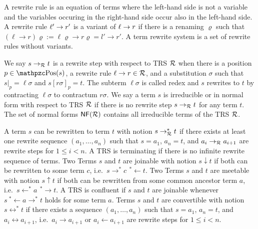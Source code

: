 \begin{definition}\label{def:rewriterule}
	A {\myem rewrite rule} is an equation of terms where the left-hand side is not a variable
	and the variables occuring in the right-hand side occur also in the left-hand side.
	A rewrite rule $\ell'\rightarrow r'$ is a {\myem variant} of $\ell\rightarrow r$ if there is a renaming $\varrho$
	such that 
	$(\ell\rightarrow r)\varrho := \ell\varrho\rightarrow r\varrho = l'\rightarrow r'$.
	A {\myem term rewrite system} is a set of rewrite rules without variants.
\end{definition}
%
\begin{definition}
	We say $s\rightarrow_{\mathcal R} t$ is a 
	{\myem rewrite step} 
	 with respect to TRS ${\mathcal R}$ 
	when there is a position $p \in \pos(s)$, 
	a rewrite rule $\ell\rightarrow r\in{\mathcal R}$, 
	and a substitution $\sigma$ such that
	$s|_p=\ell\sigma$ and $s[r\sigma]_p = t$.
		The subterm $\ell\sigma$ is called {\myem redex} and
	$s$ rewrites to $t$ by {\myem contracting} $\ell\sigma$ to {\myem contractum} $r\sigma$.
	We say a term $s$ is {\myem irreducible} or in {\myem normal form} with respect to TRS ${\mathcal R}$ if there is no rewrite step $s\rightarrow_{\mathcal R} t$ for any term $t$. 
	The set of normal forms $\mathsf{NF}({\mathcal R})$ contains all irreducible terms of the TRS ${\mathcal R}$.
	\end{definition}
%
%
\begin{definition}
	A term $s$ can be rewritten to term $t$ with notion $s\rightarrow^*_{\mathcal R} t$ 
	if there exists at least one {\myem rewrite sequence} $(a_1,\ldots ,a_n)$ such that
	$s=a_1$, $a_n=t$, and $a_i\rightarrow_{\mathcal R} a_{i+1}$ are rewrite steps for $1\leq i<n$.
	A TRS is {\myem terminating} if there is no infinite rewrite sequence of terms.
	Two Terms $s$ and $t$ are {\myem joinable} with notion $s\downarrow t$ 
	if both can be rewritten to some term $c$, i.e.~$s \rightarrow^*c\ \, ^*\!\!\leftarrow t$.
%	
	Two Terms $s$ and $t$ are {\myem meetable} with notion $s\uparrow t$ 
	if both can be rewritten from some common ancestor term $a$, i.e.~$s \leftarrow^*a\ \, ^*\!\!\rightarrow t$.
%
	A TRS is {\myem confluent } if $s$ and $t$ are joinable whenever $s\ ^*\!\!\leftarrow a \rightarrow^* t$ holds for some term $a$.
	Terms $s$ and $t$ are {\myem convertible} with notion $s\leftrightarrow^* t$ 
	if there exists a sequence $(a_1,\ldots ,a_n)$ such that
	$s=a_1$, $a_n=t$, and $a_i\leftrightarrow a_{i+1}$, i.e.~$a_i\rightarrow a_{i+1}$ or $a_i\leftarrow a_{i+1}$ are rewrite steps for $1\leq i<n$.
\end{definition}
